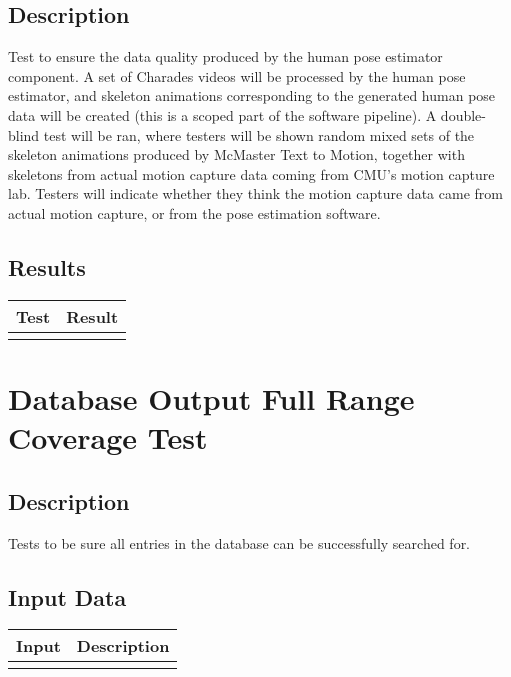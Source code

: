 \documentclass{scrreprt}
\begin{document}
\subsection{Description}
\begin{flushleft}
Test to ensure the data quality produced by the human pose estimator component. A set of Charades videos will be processed by the human pose estimator, and skeleton animations corresponding to the generated human pose data will be created (this is a scoped part of the software pipeline). A double-blind test will be ran, where testers will be shown random mixed sets of the skeleton animations produced by McMaster Text to Motion, together with skeletons from actual motion capture data coming from CMU’s motion capture lab. Testers will indicate whether they think the motion capture data came from actual motion capture, or from the pose estimation software.
\end{flushleft}
\subsection{Results}
 \centering
 \begin{tabular}{||p{2.5cm}|p{2.5cm}||}
 \hline
 \bf Test & \bf Result\\
 \hline\hline
   &  \\ %
 \hline
 \end{tabular}

\section{Database Output Full Range Coverage Test}
\subsection{Description}
\begin{flushleft}
Tests to be sure all entries in the database can be successfully searched for.
\end{flushleft}
\subsection{Input Data}
 \centering
 \begin{tabular}{p{3cm}p{6cm}}
 \hline\hline
 Input & Description\\
 \hline\hline
   &  \\ %
 \hline
 \end{tabular}
\end{document}

